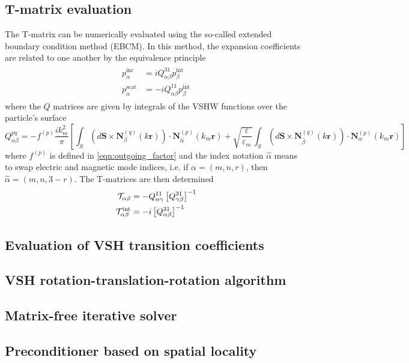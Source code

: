 \documentclass[11pt]{article}
\begin{document}
\subsection{T-matrix evaluation}
The T-matrix can be numerically evaluated using the so-called extended boundary condition method (EBCM). \cite{waterman1965matrix, barber1975scattering, mishchenko1996t}
In this method, the expansion coefficients are related to one another by the equivalence principle
\begin{align}
\begin{split}
    p^\text{inc}_\alpha &= iQ^{31}_{\alpha\beta} p^\text{int}_\beta \\
    p^\text{scat}_\alpha &= -iQ^{11}_{\alpha\beta} p^\text{int}_\beta
\end{split}
\end{align}
where the $Q$ matrices are given by integrals of the VSHW functions over the particle's surface
\begin{equation}
    Q_{\alpha \beta}^{pq} = -f^{(p)}\frac{ik_m^2}{\pi} 
    \left[ \int_S (d\bm{S} \times \bm{N}_{\beta}^{(q)}(k\bm{r})) \cdot \bm{N}_{\hat\alpha}^{(p)}(k_m \bm{r})
       + \sqrt{\frac{\varepsilon}{\varepsilon_m}}\int_S (d\bm{S} \times \bm{N}_{\hat\beta}^{(q)}(k\bm{r})) \cdot \bm{N}_{\alpha}^{(p)}(k_m \bm{r}) \right]
\end{equation}
where $f^{(p)}$ is defined in \cref{eqn:outgoing_factor} and the index notation $\hat \alpha$ means to swap electric and magnetic mode indices, i.e. if $\alpha = (m, n, r)$, then $\hat \alpha = (m, n, 3-r)$.
The T-matrices are then determined
\begin{align}
    \mathcal{T}_{\alpha\beta} &= -Q^{11}_{\alpha\gamma} \left[ Q^{31}_{\gamma\beta} \right]^{-1} \\
    \mathcal{T}_{\alpha\beta}^\text{int} &= -i\left[ Q^{31}_{\alpha\beta} \right]^{-1}
\end{align}
\subsection{Evaluation of VSH transition coefficients}
\subsection{VSH rotation-translation-rotation algorithm}
\subsection{Matrix-free iterative solver}
\subsection{Preconditioner based on spatial locality}
\end{document}
